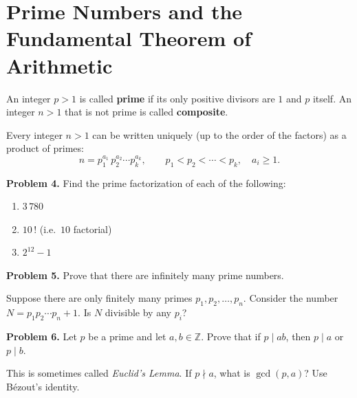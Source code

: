 \answerspace[2.5in]

\section{Prime Numbers and the Fundamental Theorem of Arithmetic}

\begin{defbox}
An integer $p > 1$ is called \textbf{prime} if its only positive divisors
are $1$ and $p$ itself.  An integer $n > 1$ that is not prime is called
\textbf{composite}.
\end{defbox}

\begin{defbox}
Every integer $n > 1$ can be written uniquely (up to the order of the
factors) as a product of primes:
\[
  n = p_1^{a_1}\, p_2^{a_2} \cdots p_k^{a_k},
  \qquad p_1 < p_2 < \cdots < p_k,\quad a_i \ge 1.
\]
\end{defbox}

\bigskip

\textbf{Problem 4.}\;
Find the prime factorization of each of the following:
\begin{enumerate}[label=(\alph*), itemsep=4pt]
  \item $3\,780$
  \item $10\,!$ (i.e.\ $10$ factorial)
  \item $2^{12} - 1$
\end{enumerate}

\answerspace[2.2in]

\textbf{Problem 5.}\;
Prove that there are infinitely many prime numbers.

\begin{hintbox}
Suppose there are only finitely many primes $p_1, p_2, \ldots, p_n$.
Consider the number $N = p_1 p_2 \cdots p_n + 1$.
Is $N$ divisible by any $p_i$?
\end{hintbox}

\answerspace[2.5in]

\textbf{Problem 6.}\;
Let $p$ be a prime and let $a, b \in \mathbb{Z}$.  Prove that if
$p \mid ab$, then $p \mid a$ or $p \mid b$.

\begin{hintbox}
This is sometimes called \emph{Euclid's Lemma}.  If $p \nmid a$, what
is $\gcd(p, a)$?  Use B\'ezout's identity.
\end{hintbox}

